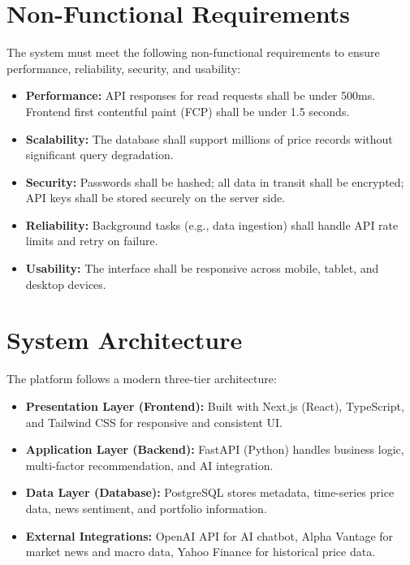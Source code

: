 \section{Non-Functional Requirements}

The system must meet the following non-functional requirements to ensure performance, reliability, security, and usability:

\begin{itemize}
    \item \textbf{Performance:} API responses for read requests shall be under 500ms. Frontend first contentful paint (FCP) shall be under 1.5 seconds.
    \item \textbf{Scalability:} The database shall support millions of price records without significant query degradation.
    \item \textbf{Security:} Passwords shall be hashed; all data in transit shall be encrypted; API keys shall be stored securely on the server side.
    \item \textbf{Reliability:} Background tasks (e.g., data ingestion) shall handle API rate limits and retry on failure.
    \item \textbf{Usability:} The interface shall be responsive across mobile, tablet, and desktop devices.
\end{itemize}

\section{System Architecture}

The platform follows a modern three-tier architecture:

\begin{itemize}
    \item \textbf{Presentation Layer (Frontend):} Built with Next.js (React), TypeScript, and Tailwind CSS for responsive and consistent UI.
    \item \textbf{Application Layer (Backend):} FastAPI (Python) handles business logic, multi-factor recommendation, and AI integration.
    \item \textbf{Data Layer (Database):} PostgreSQL stores metadata, time-series price data, news sentiment, and portfolio information.
    \item \textbf{External Integrations:} OpenAI API for AI chatbot, Alpha Vantage for market news and macro data, Yahoo Finance for historical price data.
\end{itemize}

